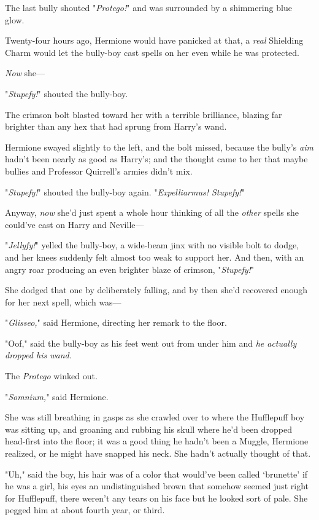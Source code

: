 The last bully shouted "\emph{Protego!}" and was surrounded by a shimmering 
blue glow.

Twenty-four hours ago, Hermione would have panicked at that, a \emph{real} 
Shielding Charm would let the bully-boy cast spells on her even while he was 
protected.

\emph{Now} she---

"\emph{Stupefy!}" shouted the bully-boy.

The crimson bolt blasted toward her with a terrible brilliance, blazing far 
brighter than any hex that had sprung from Harry's wand.

Hermione swayed slightly to the left, and the bolt missed, because the bully's 
\emph{aim} hadn't been nearly as good as Harry's; and the thought came to her 
that maybe bullies and Professor Quirrell's armies didn't mix.

"\emph{Stupefy!}" shouted the bully-boy again. "\emph{Expelliarmus! Stupefy!}"

Anyway, \emph{now} she'd just spent a whole hour thinking of all the 
\emph{other} spells she could've cast on Harry and Neville---

"\emph{Jellyfy!}" yelled the bully-boy, a wide-beam jinx with no visible bolt 
to dodge, and her knees suddenly felt almost too weak to support her. And then, 
with an angry roar producing an even brighter blaze of crimson, 
"\emph{Stupefy!}"

She dodged that one by deliberately falling, and by then she'd recovered enough 
for her next spell, which was---

"\emph{Glisseo,}" said Hermione, directing her remark to the floor.

"Oof," said the bully-boy as his feet went out from under him and \emph{he 
actually dropped his wand.}

The \emph{Protego} winked out.

"\emph{Somnium,}" said Hermione.

She was still breathing in gasps as she crawled over to where the Hufflepuff 
boy was sitting up, and groaning and rubbing his skull where he'd been dropped 
head-first into the floor; it was a good thing he hadn't been a Muggle, 
Hermione realized, or he might have snapped his neck. She hadn't actually 
thought of that.

"Uh," said the boy, his hair was of a color that would've been called 
`brunette' if he was a girl, his eyes an undistinguished brown that somehow 
seemed just right for Hufflepuff, there weren't any tears on his face but he 
looked sort of pale. She pegged him at about fourth year, or third.

